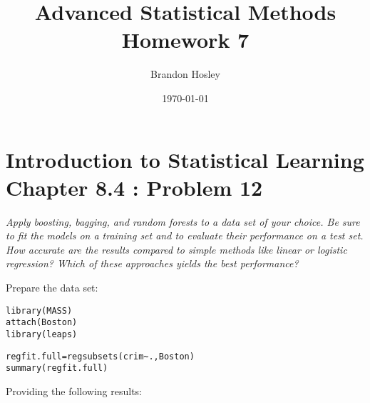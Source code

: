 \documentclass[a4paper,man,natbib]{apa6}
\title{Advanced Statistical Methods Homework 7}
\author{Brandon Hosley}
\date{\today}
\affiliation{University of Illinois - Springfield}
\begin{document}
\maketitle
\singlespacing

\section{Introduction to Statistical Learning \\ Chapter 8.4 : Problem 12}
\emph{Apply boosting, bagging, and random forests to a data set of your
	choice. Be sure to fit the models on a training set and to evaluate their
	performance on a test set. How accurate are the results compared
	to simple methods like linear or logistic regression? Which of these
	approaches yields the best performance?}

Prepare the data set:

\begin{verbatim}
library(MASS)
attach(Boston)
library(leaps)
\end{verbatim}


\begin{verbatim}
regfit.full=regsubsets(crim~.,Boston)
summary(regfit.full)
\end{verbatim}

Providing the following results: \\

\end{document}
